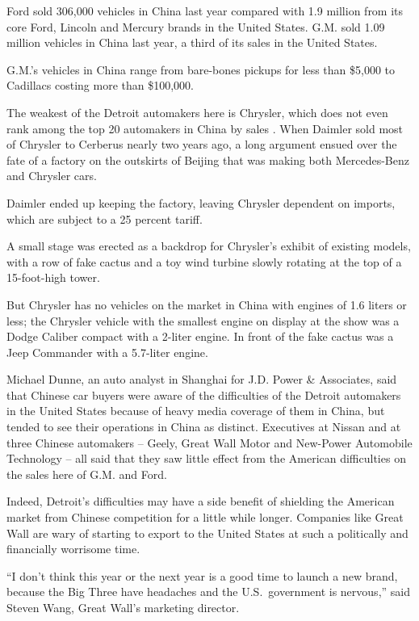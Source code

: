 \documentclass[12pt,a4paper,onecolumn]{article}
\begin{document}
Ford sold 306,000 vehicles in China last year compared with 1.9 million from its core Ford, Lincoln
and Mercury brands in the United States. G.M. sold 1.09 million vehicles in China last year, a third
of its sales in the United States.

G.M.'s vehicles in China range from bare-bones pickups for less than \$5,000 to Cadillacs costing
more than \$100,000.

The weakest of the Detroit automakers here is Chrysler, which does not even rank among the top 20
automakers in China by sales . When Daimler sold most of Chrysler to Cerberus nearly two years ago,
a long argument ensued over the fate of a factory on the outskirts of Beijing that was making both
Mercedes-Benz and Chrysler cars.

Daimler ended up keeping the factory, leaving Chrysler dependent on imports, which are subject to a
25 percent tariff.

A small stage was erected as a backdrop for Chrysler's exhibit of existing models, with a row of
fake cactus and a toy wind turbine slowly rotating at the top of a 15-foot-high tower.

But Chrysler has no vehicles on the market in China with engines of 1.6 liters or less; the Chrysler
vehicle with the smallest engine on display at the show was a Dodge Caliber compact with a 2-liter
engine. In front of the fake cactus was a Jeep Commander with a 5.7-liter engine.

Michael Dunne, an auto analyst in Shanghai for J.D. Power \& Associates, said that Chinese car
buyers were aware of the difficulties of the Detroit automakers in the United States because of
heavy media coverage of them in China, but tended to see their operations in China as distinct.
Executives at Nissan and at three Chinese automakers -- Geely, Great Wall Motor and New-Power
Automobile Technology -- all said that they saw little effect from the American difficulties on the
sales here of G.M. and Ford.

Indeed, Detroit's difficulties may have a side benefit of shielding the American market from Chinese
competition for a little while longer. Companies like Great Wall are wary of starting to export to
the United States at such a politically and financially worrisome time.

``I don't think this year or the next year is a good time to launch a new brand, because the Big
Three have headaches and the U.S.~government is nervous,'' said Steven Wang, Great Wall's marketing
director.
\end{document}
